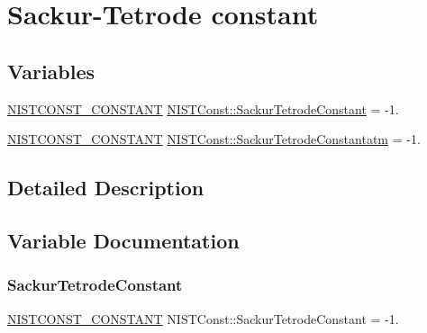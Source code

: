 \hypertarget{group___n_i_s_t_const-_sackur_tetrode_constant}{}\section{Sackur-\/\+Tetrode constant}
\label{group___n_i_s_t_const-_sackur_tetrode_constant}
\subsection*{Variables}
\begin{DoxyCompactItemize}
\item 
\mbox{\hyperlink{group___n_i_s_t_const-_macros_ga2b0fc1d7452373f816175dd86ce26729}{N\+I\+S\+T\+C\+O\+N\+S\+T\+\_\+\+C\+O\+N\+S\+T\+A\+NT}} \mbox{\hyperlink{group___n_i_s_t_const-_sackur_tetrode_constant_ga855d127fef012cffe2ffe38cdb1b61fa}{N\+I\+S\+T\+Const\+::\+Sackur\+Tetrode\+Constant}} = -\/1.
\item 
\mbox{\hyperlink{group___n_i_s_t_const-_macros_ga2b0fc1d7452373f816175dd86ce26729}{N\+I\+S\+T\+C\+O\+N\+S\+T\+\_\+\+C\+O\+N\+S\+T\+A\+NT}} \mbox{\hyperlink{group___n_i_s_t_const-_sackur_tetrode_constant_ga7f3efde326ea5cfe5e2d85d81a92fb3b}{N\+I\+S\+T\+Const\+::\+Sackur\+Tetrode\+Constantatm}} = -\/1.
\end{DoxyCompactItemize}


\subsection{Detailed Description}


\subsection{Variable Documentation}
\mbox{\label{group___n_i_s_t_const-_sackur_tetrode_constant_ga855d127fef012cffe2ffe38cdb1b61fa}} 
\subsubsection{\texorpdfstring{Sackur\+Tetrode\+Constant}{SackurTetrodeConstant}}
{\footnotesize\ttfamily \mbox{\hyperlink{group___n_i_s_t_const-_macros_ga2b0fc1d7452373f816175dd86ce26729}{N\+I\+S\+T\+C\+O\+N\+S\+T\+\_\+\+C\+O\+N\+S\+T\+A\+NT}} N\+I\+S\+T\+Const\+::\+Sackur\+Tetrode\+Constant = -\/1.}

